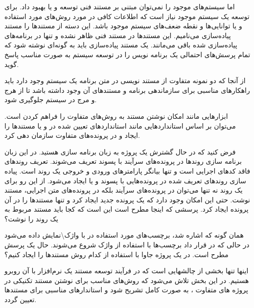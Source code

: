 اما سیستم‌های موجود را نمی‌توان مبتنی بر مستند فنی توسعه و یا بهبود داد. برای توسعه
یک سیستم موجود نیاز است که اطلاعات کافی در مورد روش‌های مورد استفاده و یا توانایی‌ها 
و نقطه ضعف‌های سیستم موجود باشد. این دسته از مستندها را مستند پیاده‌سازی می‌نامیم. 
این مستندها در مستند فنی ظاهر نشده و تنها در برنامه‌های پیاده‌سازی شده باقی می‌مانند.
یک مستند پیاده‌سازی باید به گونه‌ای نوشته شود که تمام پرسش‌های احتمالی یک برنامه نویس را 
در توسعه سیستم به صورت مناسب پاسخ گوید.

از آنجا که دو نمونه متفاوت از مستند نویسی در متن برنامه یک سیستم وجود دارد باید 
راهکارهای مناسبی برای سازماندهی برنامه و مستندهای آن وجود داشته باشد تا از هرج و 
مرج در سیستم جلوگیری شود.

ابزارهایی مانند  امکان نوشتن مستند به روش‌های متفاوت
را فراهم کردن است. می‌توان بر اساس  استانداردهایی مانند استانداردهای تعیین
شده در  و یا  مستندها را ایجاد و در پرونده‌های متفاوت
سازمان دهی کرد.

فرض کنید که در حال گشترش یک پروژه به زبان برنامه سازی  هستید. در
این زبان برنامه سازی روندها در پرونده‌های سرآیند با پسوند  تعریف
می‌شوند. تعریف روندهای فاقد کدهای اجرایی است و تنها بیانگر پارامترهای ورودی
و خروجی یک روند است. پیاده سازی روندهای تعریف شده در  پرونده‌هایی با پسوند
 و یا  ایجاد می‌شود. از این رو برای یک روند نه تنها می‌توان
در پرونده‌های سرآیند بلکه در پرونده‌های متن اجرایی، مستند نوشت. حتی این
امکان وجود دارد که یک پرونده جدید  ایجاد کرد و تنها مستندها را در آن پرونده
ایجاد کرد. پرسشی که اینجا مطرح است این است که کجا باید مستند  مربوط به یک
روند را نوشت؟

همان گونه که اشاره شد، برچسب‌های مورد استفاده در  با
واژک\textbackslash نمایش داده می‌شود در حالی که در قرار داد  
برچسب‌ها با استفاده از واژک  شروع  می‌شوند. حال یک پرسش مطرح است. در
یک پروژه جاوا با استفاده از کدام روش مستندها را ایجاد کنیم؟

اینها تنها بخشی از چالشهایی است که در فرآیند توسعه مستند یک نرم‌افزار با آن
روبرو  هستیم. در این بخش تلاش می‌شود که روش‌های مناسب برای نوشتن مستند
تکنیکی در پروژه های متفاوت ، به صورت  کامل تشریح شود و استاندارهای مناسبی
برای مستندها تعیین گردد.






%
